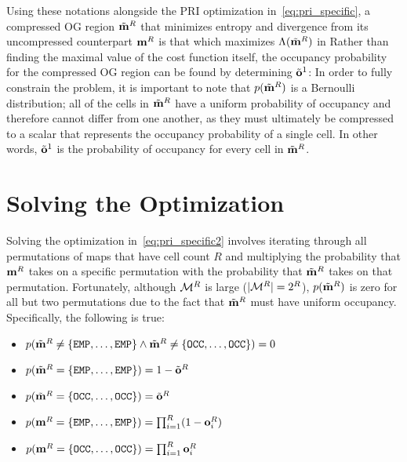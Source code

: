 Using these notations alongside the PRI optimization in~\eqref{eq:pri_specific}, a
compressed OG region $\tilde{\mathbf{m}}^{R}$ that minimizes entropy and divergence from
its uncompressed counterpart $\mathbf{m}^{R}$ is that which maximizes $\Lambda(\tilde{\mathbf{m}}^{R})$ in
%
%
Rather than finding the maximal value of the cost function itself, the
occupancy probability for the compressed OG region can be found by determining
$\tilde{\mathbf{o}}^{1}$:
%
%
In order to fully constrain the problem, it is important to note that
$p(\tilde{\mathbf{m}}^{R})$ is a Bernoulli distribution; all of the cells in
$\tilde{\mathbf{m}}^{R}$ have a uniform probability of occupancy and therefore
cannot differ from one another, as they must ultimately be compressed to a
scalar that represents the occupancy probability of a single cell. In other
words, $\tilde{\mathbf{o}}^{1}$ is the probability of occupancy for every cell in
$\tilde{\mathbf{m}}^{R}$.

\section{Solving the Optimization}
\label{sec:solving_pri}

Solving the optimization in~\eqref{eq:pri_specific2} involves iterating through all
permutations of maps that have cell count $R$ and multiplying the probability that
$\mathbf{m}^{R}$ takes on a specific permutation with the probability that
$\tilde{\mathbf{m}}^{R}$ takes on that permutation. Fortunately, although $\mathcal{M}^{R}$ is large
($\vert \mathcal{M}^{R} \vert = 2^{R}$), $p(\tilde{\mathbf{m}}^{R})$ is zero for
all but two permutations due to the fact that $\tilde{\mathbf{m}}^{R}$ must have
uniform occupancy. Specifically, the following is true:

\begin{itemize}
  \item
    $p(
    \tilde{\mathbf{m}}^{R}
    \ne
    \{\texttt{EMP}, \dots, \texttt{EMP}\}
    \wedge
    \tilde{\mathbf{m}}^{R}
    \ne
    \{\texttt{OCC}, \dots, \texttt{OCC}\}
    ) = 0$
  \item
    $p(\tilde{\mathbf{m}}^{R}
    =
    \{\texttt{EMP}, \dots, \texttt{EMP}\}) = 1 - \tilde{\mathbf{o}}^{R}$
  \item
    $p(\tilde{\mathbf{m}}^{R}
    =
    \{\texttt{OCC}, \dots, \texttt{OCC}\}) = \tilde{\mathbf{o}}^{R}$
  \item
    $p(\mathbf{m}^{R} = \{\texttt{EMP},\dots,\texttt{EMP}\})
    =
    \prod_{i=1}^{R}(1-\mathbf{o}^{R}_{i})$
  \item
    $p(\mathbf{m}^{R} = \{\texttt{OCC},\dots,\texttt{OCC}\})
    =
    \prod_{i=1}^{R}\mathbf{o}^{R}_{i}$
\end{itemize}

